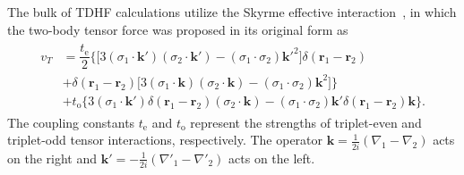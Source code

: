 \documentclass[aps,prc,twocolumn,showpacs,superscriptaddress,longbibliography,floatfix,10pt]{revtex4-1}
\begin{document}
The bulk of TDHF calculations utilize the Skyrme effective interaction~\cite{skyrme1956}, in which the two-body tensor force was proposed in its original form as
\begin{align}
\begin{split}
v_T&=\dfrac{t_\mathrm{e}}{2}\bigg\{\big[3({\sigma}_\mathrm{1}\cdot\mathbf{k}')({\sigma}_\mathrm{2}\cdot\mathbf{k}')-({\sigma}_\mathrm{1}\cdot{\sigma}_\mathrm{2})\mathbf{k}'^{\mathrm{2}}\big]\delta(\mathbf{r}_\mathrm{1}-\mathbf{r}_\mathrm{2})\\
&+\delta(\mathbf{r}_\mathrm{1}-\mathbf{r}_\mathrm{2})\big[3({\sigma}_\mathrm{1}\cdot\mathbf{k})({\sigma}_\mathrm{2}\cdot\mathbf{k})-({\sigma}_\mathrm{1}\cdot{\sigma}_\mathrm{2})\mathbf{k}^\mathrm{2}\big]\bigg\}\\
&+t_\mathrm{o}\bigg\{3({\sigma}_\mathrm{1}\cdot\mathbf{k}')\delta(\mathbf{r}_\mathrm{1}-\mathbf{r}_\mathrm{2})({\sigma}_\mathrm{2}\cdot\mathbf{k})-({\sigma}_\mathrm{1}\cdot{\sigma}_\mathrm{2})\mathbf{k}'
\delta(\mathbf{r}_\mathrm{1}-\mathbf{r}_\mathrm{2})\mathbf{k}\bigg\}.
\end{split}
\end{align}
The coupling constants $t_\textrm{e}$ and $t_\textrm{o}$ represent the strengths of triplet-even and
triplet-odd tensor interactions, respectively.  The operator $\mathbf{k}=\frac{1}{2i}(\nabla_1-\nabla_2)$ acts on the right and
$\mathbf{k}'=-\frac{1}{2i}(\nabla'_1-\nabla'_2)$ acts on the left.
\end{document}
